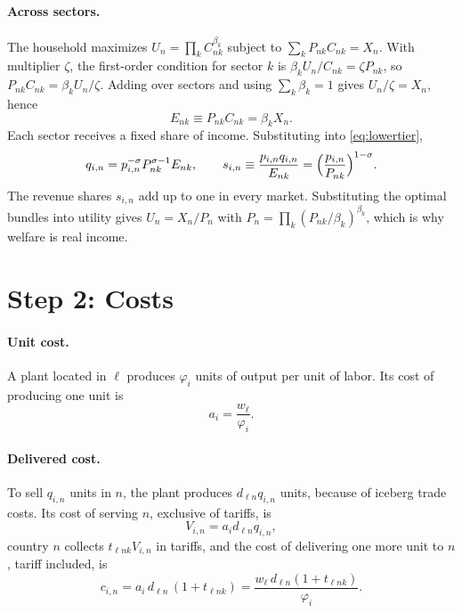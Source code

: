 \documentclass[11pt]{article}
\begin{document}
\paragraph{Across sectors.} The household maximizes $U_n=\prod_kC_{nk}^{\beta_k}$
subject to $\sum_kP_{nk}C_{nk}=X_n$. With multiplier $\zeta$, the first-order condition
for sector $k$ is $\beta_kU_n/C_{nk}=\zeta P_{nk}$, so $P_{nk}C_{nk}=\beta_kU_n/\zeta$.
Adding over sectors and using $\sum_k\beta_k=1$ gives $U_n/\zeta=X_n$, hence
\begin{equation}
  E_{nk}\equiv P_{nk}C_{nk}=\beta_kX_n .
  \label{eq:spending}
\end{equation}
Each sector receives a fixed share of income. Substituting into \eqref{eq:lowertier},
\begin{equation}
  q_{i,n}=p_{i,n}^{-\sigma}P_{nk}^{\sigma-1}E_{nk},
  \qquad
  s_{i,n}\equiv\frac{p_{i,n}q_{i,n}}{E_{nk}}=\Bigl(\frac{p_{i,n}}{P_{nk}}\Bigr)^{1-\sigma}.
  \label{eq:demand}
\end{equation}
The revenue shares $s_{i,n}$ add up to one in every market. Substituting the optimal
bundles into utility gives $U_n=X_n/P_n$ with $P_n=\prod_k(P_{nk}/\beta_k)^{\beta_k}$,
which is why welfare is real income.

\section{Step 2: Costs}
\label{sec:costs}

\paragraph{Unit cost.} A plant located in $\ell$ produces $\varphi_i$ units of output
per unit of labor. Its cost of producing one unit is
\begin{equation}
  a_i=\frac{w_\ell}{\varphi_i}.
  \label{eq:unitcost}
\end{equation}

\paragraph{Delivered cost.} To sell $q_{i,n}$ units in $n$, the plant produces
$d_{\ell n}q_{i,n}$ units, because of iceberg trade costs. Its cost of serving $n$,
exclusive of tariffs, is
\begin{equation}
  V_{i,n}=a_id_{\ell n}q_{i,n},
  \label{eq:V}
\end{equation}
country $n$ collects $t_{\ell nk}V_{i,n}$ in tariffs, and the cost of delivering one
more unit to $n$, tariff included, is
\begin{equation}
  c_{i,n}=a_i\,d_{\ell n}\,(1+t_{\ell nk})
  =\frac{w_\ell\,d_{\ell n}(1+t_{\ell nk})}{\varphi_i}.
  \label{eq:delivered}
\end{equation}
\end{document}
